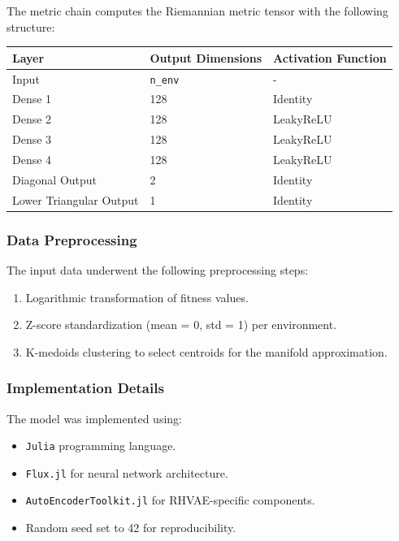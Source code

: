 \documentclass[
]{scrartcl}
\begin{document}
\begin{refsection}
The metric chain computes the Riemannian metric tensor with the
following structure:

\begin{longtable}[]{@{}lll@{}}
\toprule\noalign{}
Layer & Output Dimensions & Activation Function \\
\midrule\noalign{}
\endhead
\bottomrule\noalign{}
\endlastfoot
Input & \texttt{n\_env} & - \\
Dense 1 & 128 & Identity \\
Dense 2 & 128 & LeakyReLU \\
Dense 3 & 128 & LeakyReLU \\
Dense 4 & 128 & LeakyReLU \\
Diagonal Output & 2 & Identity \\
Lower Triangular Output & 1 & Identity \\
\end{longtable}

\subsubsection{Data Preprocessing}\label{data-preprocessing}

The input data underwent the following preprocessing steps:

\begin{enumerate}
\def\labelenumi{\arabic{enumi}.}
\item
  Logarithmic transformation of fitness values.
\item
  Z-score standardization (mean = 0, std = 1) per environment.
\item
  K-medoids clustering to select centroids for the manifold
  approximation.
\end{enumerate}

\subsubsection{Implementation Details}\label{implementation-details-1}

The model was implemented using:

\begin{itemize}
\item
  \texttt{Julia} programming language.
\item
  \texttt{Flux.jl} for neural network architecture.
\item
  \texttt{AutoEncoderToolkit.jl} for RHVAE-specific components.
\item
  Random seed set to 42 for reproducibility.
\end{itemize}


\end{refsection}
\end{document}
